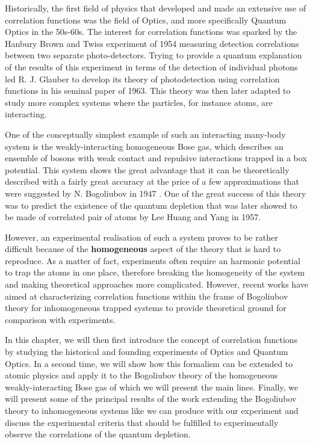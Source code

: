 Historically, the first field of physics that developed and made an extensive use of correlation functions was the field of Optics, and more specifically Quantum Optics in the 50s-60s. The interest for correlation functions was sparked by the Hanbury Brown and Twiss experiment of 1954 measuring detection correlations between two separate photo-detectors. Trying to provide a quantum explanation of the results of this experiment in terms of the detection of individual photons led R. J. Glauber to develop its theory of photodetection \cite{glauber1963quantum} using correlation functions in his seminal paper of 1963. This theory was then later adapted to study more complex systems where the particles, for instance atoms, are interacting. 

One of the conceptually simplest example of such an interacting many-body system is the weakly-interacting homogeneous Bose gas, which describes an ensemble of bosons with weak contact and repulsive interactions trapped in a box potential. This system shows the great advantage that it can be theoretically described with a fairly great accuracy at the price of a few approximations that were suggested by N. Bogoliubov in 1947 \cite{bogoliubov1947}. One of the great success of this theory was to predict the existence of the quantum depletion that was later showed to be made of \kmk correlated pair of atoms by Lee Huang and Yang \cite{lee1957} in 1957.

However, an experimental realisation of such a system proves to be rather difficult because of the \textbf{homogeneous} aspect of the theory that is hard to reproduce. As a matter of fact, experiments often require an harmonic potential to trap the atoms in one place, therefore breaking the homogeneity of the system and making theoretical approaches more complicated. However, recent works \cite{butera2020,mathey2009noise,toth2008theory} have aimed at characterizing correlation functions within the frame of Bogoliubov theory for inhomogeneous trapped systems to provide theoretical ground for comparison with experiments. 

In this chapter, we will then first introduce the concept of correlation functions by studying the historical and founding experiments of Optics and Quantum Optics. In a second time, we will show how this formalism can be extended to atomic physics and apply it to the Bogoliubov theory of the homogeneous weakly-interacting Bose gas of which we will present the main lines. Finally, we will present some of the principal results of the work \cite{butera2020} extending the Bogoliubov theory to inhomogeneous systems like we can produce with our experiment and discuss the experimental criteria that should be fulfilled to experimentally observe the \kmk correlations of the quantum depletion. 




